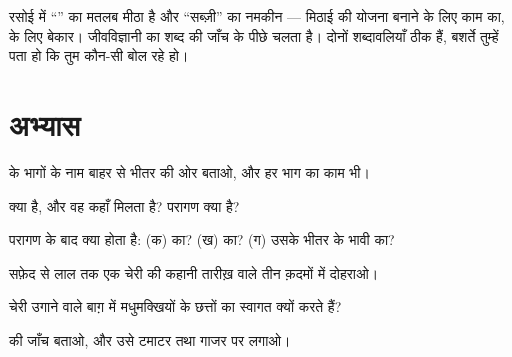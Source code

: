 \begin{remark}[रसोई के शब्द, विज्ञान के शब्द]\label{rem:g3:flowers-fruits-seeds:words}
रसोई में ``'' का मतलब मीठा है और ``सब्ज़ी'' का नमकीन --- मिठाई की
योजना बनाने के लिए काम का,  के लिए बेकार। जीवविज्ञानी का
शब्द  की जाँच के पीछे चलता है। दोनों शब्दावलियाँ ठीक हैं, बशर्ते
तुम्हें पता हो कि तुम कौन-सी बोल रहे हो।
\end{remark}

\section{अभ्यास}

\begin{exercise}[$\star$]\label{exo:g3:flowers-fruits-seeds:1}
 के भागों के नाम बाहर से भीतर की ओर बताओ, और हर भाग का काम भी।
\end{exercise}

\begin{exercise}[$\star$]\label{exo:g3:flowers-fruits-seeds:2}
 क्या है, और वह कहाँ मिलता है? परागण क्या है?
\end{exercise}

\begin{exercise}[$\star$]\label{exo:g3:flowers-fruits-seeds:3}
परागण के बाद क्या होता है: (क)  का? (ख)  का? (ग)
उसके भीतर के भावी  का?
\end{exercise}

\begin{exercise}[$\star$]\label{exo:g3:flowers-fruits-seeds:4}
सफ़ेद  से लाल  तक एक चेरी की कहानी तारीख़ वाले तीन क़दमों में
दोहराओ।
\end{exercise}

\begin{exercise}[$\star$]\label{exo:g3:flowers-fruits-seeds:5}
चेरी उगाने वाले बाग़ में मधुमक्खियों के छत्तों का स्वागत क्यों करते हैं?
\end{exercise}

\begin{exercise}[$\star$]\label{exo:g3:flowers-fruits-seeds:6}
 की जाँच बताओ, और उसे टमाटर तथा गाजर पर लगाओ।
\end{exercise}

